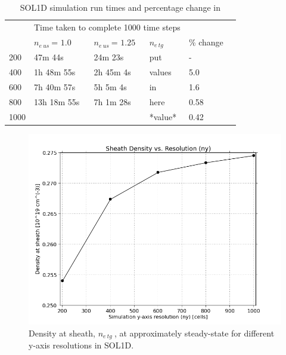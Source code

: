 \documentclass[11pt]{article}  %
\providecommand{\neus}{$n_{e~us}~$} %
\providecommand{\netg}{$n_{e~tg}~$} %
\begin{document}
\begin{table}[]
\caption{SOL1D simulation run times and percentage change in }
\label{tabsol1dres}
\begin{tabular}{l|l|l|l|l|l}
\multicolumn{1}{l|}{\multirow{2}{*}{}} & \multicolumn{3}{l}{Time taken to complete 1000 time steps}    \\ \cline{2-3} 
 \multicolumn{1}{l|}{Resolution}        & \multicolumn{1}{l|}{\neus = $1.0$} & \multicolumn{1}{l|}{\neus = $1.25$}  & \netg & \% change  \\ \hline
                   200                 &      47m 44s          &    24m 23s         &  put    &  -    \\
                   400                 &      1h 48m 55s       &    2h 45m 4s       &  values & 5.0   \\
                   600                 &      7h 40m 57s       &    5h 5m 4s        &  in     & 1.6   \\
                   800                 &      13h 18m 55s      &    7h 1m 28s       &  here   & 0.58  \\
                  1000                 &                   &                        & *value* & 0.42
\end{tabular}
\end{table}

\begin{figure}
\includegraphics[scale=0.48]{Figures/sol1d/RE_neres1000.png}
\centering
\caption{Density at sheath, \netg, at approximately steady-state for different y-axis resolutions in SOL1D.}\label{figRE_neres1000}
\end{figure}
\end{document}
